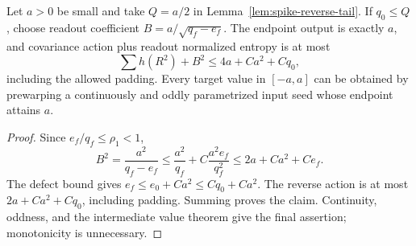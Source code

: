 \begin{corollary}
\label{cor:spike-four-amplitude}
Let $a>0$ be small and take $Q=a/2$ in Lemma~\ref{lem:spike-reverse-tail}. If $q_0\le Q$, choose readout coefficient $B=a/\sqrt{q_f-e_f}$. The endpoint output is exactly $a$, and covariance action plus readout normalized entropy is at most
\[
 \sum h(R^2)+B^2\le4a+Ca^2+Cq_0,
\]
including the allowed padding. Every target value in $[-a,a]$ can be obtained by prewarping a continuously and oddly parametrized input seed whose endpoint attains $a$.
\end{corollary}
\begin{proof}
Since $e_f/q_f\le\rho_1<1$,
\[
 B^2=\frac{a^2}{q_f-e_f}
 \le\frac{a^2}{q_f}+C\frac{a^2e_f}{q_f^2}
 \le2a+Ca^2+Ce_f.
\]
The defect bound gives $e_f\le e_0+Ca^2\le Cq_0+Ca^2$. The reverse action is at most $2a+Ca^2+Cq_0$, including padding. Summing proves the claim. Continuity, oddness, and the intermediate value theorem give the final assertion; monotonicity is unnecessary.
\end{proof}
